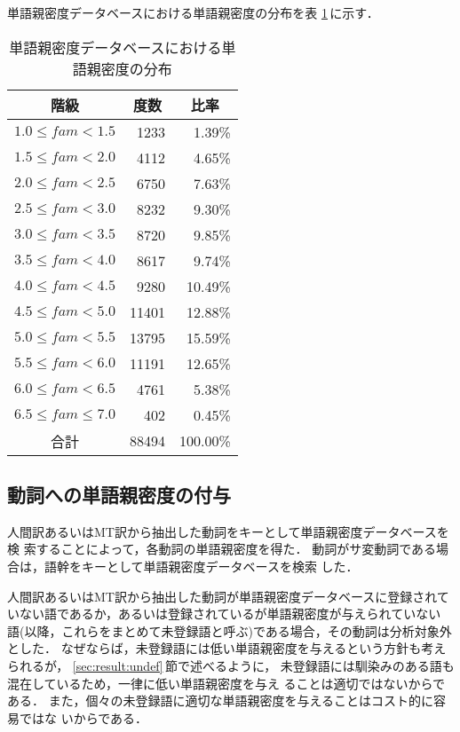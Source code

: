 単語親密度データベースにおける単語親密度の分布を表
\ref{tab:histgram-database}\,に示す．
\begin{table}[htbp]
\caption{単語親密度データベースにおける単語親密度の分布}
\label{tab:histgram-database}
\begin{center}
\begin{tabular}{|c||r|r|}\hline
階級 & \multicolumn{1}{c|}{度数} & \multicolumn{1}{c|}{比率}\\\hline\hline
$1.0 \le fam < 1.5$   &  1233 &   1.39\% \\
$1.5 \le fam < 2.0$   &  4112 &   4.65\% \\
$2.0 \le fam < 2.5$   &  6750 &   7.63\% \\
$2.5 \le fam < 3.0$   &  8232 &   9.30\% \\
$3.0 \le fam < 3.5$   &  8720 &   9.85\% \\
$3.5 \le fam < 4.0$   &  8617 &   9.74\% \\
$4.0 \le fam < 4.5$   &  9280 &  10.49\% \\
$4.5 \le fam < 5.0$   & 11401 &  12.88\% \\
$5.0 \le fam < 5.5$   & 13795 &  15.59\% \\
$5.5 \le fam < 6.0$   & 11191 &  12.65\% \\
$6.0 \le fam < 6.5$   &  4761 &   5.38\% \\
$6.5 \le fam \le 7.0$ &   402 &   0.45\% \\\hline
合計                  & 88494 & 100.00\% \\\hline
\end{tabular}
\end{center}
\end{table}

\subsection{動詞への単語親密度の付与}
\label{sec:method:matching}

人間訳あるいはMT訳から抽出した動詞をキーとして単語親密度データベースを検
索することによって，各動詞の単語親密度を得た．
動詞がサ変動詞である場合は，語幹をキーとして単語親密度データベースを検索
した．

人間訳あるいはMT訳から抽出した動詞が単語親密度データベースに登録されて
いない語であるか，あるいは登録されているが単語親密度が与えられていない
語(以降，これらをまとめて未登録語と呼ぶ)である場合，その動詞は分析対象外
とした．
なぜならば，未登録語には低い単語親密度を与えるという方針も考えられるが，
\ref{sec:result:undef}\,節で述べるように，
未登録語には馴染みのある語も混在しているため，一律に低い単語親密度を与え
ることは適切ではないからである．
また，個々の未登録語に適切な単語親密度を与えることはコスト的に容易ではな
いからである．

